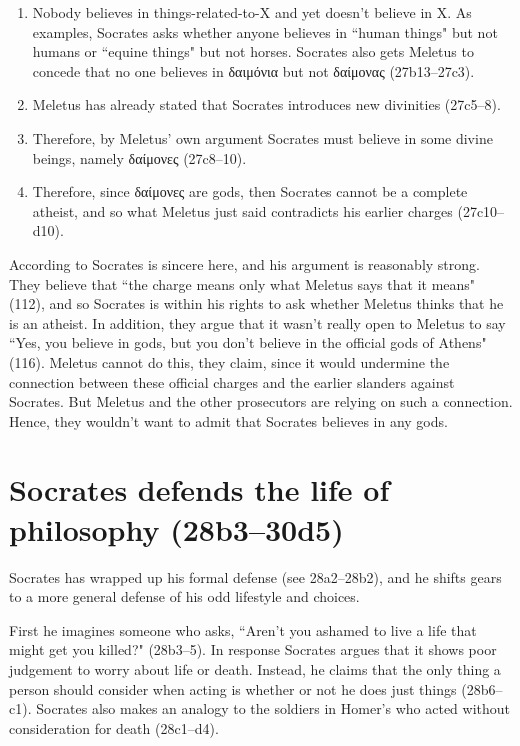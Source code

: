 \documentclass[11pt]{article}
\begin{document}
\begin{enumerate}
    \item Nobody believes in things-related-to-X and yet doesn't believe in X.  As examples, Socrates asks whether anyone believes in ``human things" but not humans or ``equine things" but not horses.  Socrates also gets Meletus to concede that no one believes in δαιμόνια but not δαίμονας (27b13--27c3).
    \item Meletus has already stated that Socrates introduces new divinities (27c5--8).
    \item Therefore, by Meletus' own argument Socrates must believe in some divine beings, namely δαίμονες (27c8--10).
    \item Therefore, since δαίμονες are gods, then Socrates cannot be a complete atheist, and so what Meletus just said contradicts his earlier charges (27c10--d10).
\end{enumerate}

According to \citeauthor{brickhouse2004} Socrates is sincere here, and his argument is reasonably strong.  They believe that ``the charge means only what Meletus says that it means" (112), and so Socrates is within his rights to ask whether Meletus thinks that he is an atheist.  In addition, they argue that it wasn't really open to Meletus to say ``Yes, you believe in gods, but you don't believe in the official gods of Athens" (116).  Meletus cannot do this, they claim, since it would undermine the connection between these official charges and the earlier slanders against Socrates.  But Meletus and the other prosecutors are relying on such a connection.  Hence, they wouldn't want to admit that Socrates believes in any gods.


\section{Socrates defends the life of philosophy (28b3--30d5)}

Socrates has wrapped up his formal defense (see 28a2--28b2), and he shifts gears to a more general defense of his odd lifestyle and choices.

First he imagines someone who asks, ``Aren't you ashamed to live a life that might get you killed?" (28b3--5).  In response Socrates argues that it shows poor judgement to worry about life or death. Instead, he claims that the only thing a person should consider when acting is whether or not he does just things (28b6--c1).  Socrates also makes an analogy to the soldiers in Homer's  who acted without consideration for death (28c1--d4).
\end{document}
